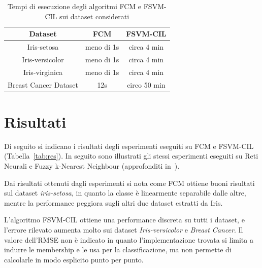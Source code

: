 \documentclass[oneside, openany]{book}
\begin{document}
		
	\begin{table}[h]
		\caption{Tempi di esecuzione degli algoritmi FCM e FSVM-CIL sui dataset considerati}
		\begin{center}\begin{tabular}{ |c|c|c| } 
				\hline
				\textbf{Dataset} & \textbf{FCM} & \textbf{FSVM-CIL}\\
				\hline
				Iris-setosa & meno di 1s & circa 4 min\\
				\hline
				Iris-versicolor & meno di 1s & circa 4 min\\
				\hline
				Iris-virginica & meno di 1s & circa 4 min\\
				\hline
				Breast Cancer Dataset &  12s & circo 50 min\\
				\hline									
			\end{tabular}
		\end{center}
		\label{tab:tempi}	
	\end{table}
	
	\section{Risultati}
		Di seguito si indicano i risultati degli esperimenti eseguiti su FCM e FSVM-CIL (Tabella~\ref{tab:res}). In seguito sono illustrati gli stessi esperimenti eseguiti su Reti Neurali e Fuzzy k-Nearest Neighbour (approfonditi in~\cite{bib:rita}).
		
		Dai risultati ottenuti dagli esperimenti si nota come FCM ottiene buoni risultati sul dataset \textit{iris-setosa}, in quanto la classe è linearmente separabile dalle altre, mentre la performance peggiora sugli altri due dataset estratti da Iris.
		
		L'algoritmo FSVM-CIL ottiene una performance discreta su tutti i dataset, e l'errore rilevato aumenta molto sui dataset \textit{Iris-versicolor} e \textit{Breast Cancer}. Il valore dell'RMSE non è indicato in quanto l'implementazione trovata si limita a indurre le membership e le usa per la classificazione, ma non permette di calcolarle in modo esplicito punto per punto.
\end{document}
